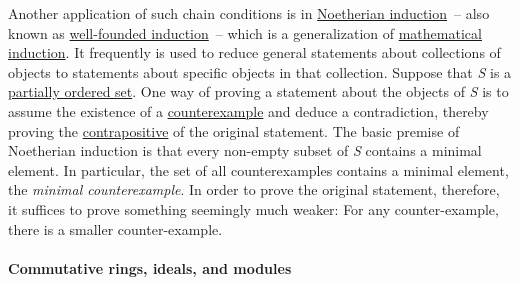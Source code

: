 Another application of such chain conditions is in \href{https://en.wikipedia.org/wiki/Noetherian_induction}{Noetherian induction}{~}{--}{ }also known as \href{https://en.wikipedia.org/wiki/Well-founded_induction}{well-founded induction}{~}{--}{ }which is a generalization of \href{https://en.wikipedia.org/wiki/Mathematical_induction}{mathematical induction}. It frequently is used to reduce general statements about collections of objects to statements about specific objects in that collection. Suppose that {\emph{S}} is a \href{https://en.wikipedia.org/wiki/Partially_ordered_set}{partially ordered set}. One way of proving a statement about the objects of {\emph{S}} is to assume the existence of a \href{https://en.wikipedia.org/wiki/Counterexample}{counterexample} and deduce a contradiction, thereby proving the \href{https://en.wikipedia.org/wiki/Contrapositive}{contrapositive} of the original statement. The basic premise of Noetherian induction is that every non-empty subset of {\emph{S}} contains a minimal element. In particular, the set of all counterexamples contains a minimal element, the \emph{minimal counterexample}. In order to prove the original statement, therefore, it suffices to prove something seemingly much weaker: For any counter-example, there is a smaller counter-example.


\paragraph[Commutative rings, ideals, and modules]{\texorpdfstring{\protect\hypertarget{Commutative_rings.2C_ideals.2C_and_modules}{}{}Commutative rings, ideals, and modules}{Commutative rings, ideals, and modules}}\label{Commutative_ringsux2c_idealsux2c_and_modules}

